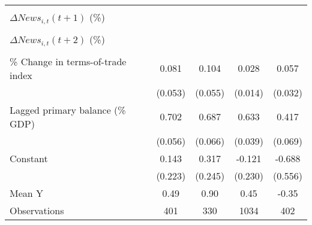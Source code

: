 {\begin{tabular}{l*{4}{c}}
                    &                     &                     &                     &                     \\
\addlinespace
$ \Delta News_{i,t}(t+1)$ (\%)&                     &                     &                     &                     \\
                    &                     &                     &                     &                     \\
\addlinespace
$ \Delta News_{i,t}(t+2)$ (\%)&                     &                     &                     &                     \\
                    &                     &                     &                     &                     \\
\addlinespace
\% Change in terms-of-trade index&       0.081         &       0.104\sym{*}  &       0.028\sym{**} &       0.057\sym{*}  \\
                    &     (0.053)         &     (0.055)         &     (0.014)         &     (0.032)         \\
\addlinespace
Lagged primary balance (\% GDP)&       0.702\sym{***}&       0.687\sym{***}&       0.633\sym{***}&       0.417\sym{***}\\
                    &     (0.056)         &     (0.066)         &     (0.039)         &     (0.069)         \\
\addlinespace
Constant            &       0.143         &       0.317         &      -0.121         &      -0.688         \\
                    &     (0.223)         &     (0.245)         &     (0.230)         &     (0.556)         \\
\midrule
Mean Y              &        0.49         &        0.90         &        0.45         &       -0.35         \\
Observations        &         401         &         330         &        1034         &         402         \\
\bottomrule
\end{tabular}
}
